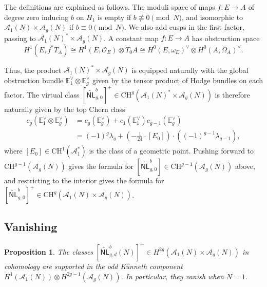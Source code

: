 \documentclass[12pt]{amsart}
\def\cA{\mathcal{A}}
\def\bE{\mathbb{E}}
\def\cO{\mathcal{O}}
\newcommand{\CH}{\mathrm{CH}}
\newcommand{\wNL}{{\widetilde{\mathsf{NL}}}}
\newtheorem{prop}[thm]{Proposition}
\theoremstyle{definition}
\begin{document}
 The definitions are explained as follows. The moduli space of maps $f:E\to A$ of degree zero inducing $b$ on $H_1$ is empty if $b\not\equiv0\pmod{N}$, and isomorphic to $\cA_1(N)\times\cA_g(N)$ if $b\equiv0\pmod{N}$. We also add cusps in the first factor, passing to $\cA_1(N)^{*}\times\cA_g(N)$. A constant map $f:E\to A$ has obstruction space 
 \begin{equation*}
 H^1(E,f^{*}T_A)\cong H^1(E,\cO_E)\otimes T_0A\cong H^0(E,\omega_E)^\vee \otimes H^0(A,\Omega_A)^\vee.
 \end{equation*}

 Thus, the product $\cA_1(N)^{*}\times\cA_g(N)$ is equipped naturally with the global obstruction bundle $\bE_1^{\vee}\otimes\bE_g^{\vee}$ given by the tensor product of Hodge bundles on each factor. The virtual class $[\wNL^b_{g,0}]^+\in \CH^g(\cA_1(N)^{*}\times\cA_g(N))$ is therefore naturally given by the top Chern class
 \begin{align*}
     c_g(\bE_1^{\vee}\otimes\bE_g^{\vee})&=c_g(\bE_g^{\vee})+c_1(\bE_1^{\vee})c_{g-1}(\bE_g^{\vee})\\
     &=(-1)^g\lambda_g+\left(-\frac{1}{24}\cdot[E_0]\right)\cdot((-1)^{g-1}\lambda_{g-1}),
 \end{align*}
 where $[E_0]\in \CH^1(\cA_1^{*})$ is the class of a geometric point. Pushing forward to $\CH^{g-1}(\cA_g(N))$ gives the formula for $[\wNL^b_{g,0}]\in \CH^{g-1}(\cA_g(N))$ above, and restricting to the interior gives the formula for $ [\wNL^b_{g,0}]^+\in \CH^g(\cA_1(N)\times\cA_g(N))$.

 \subsection{Vanishing}

\begin{prop}\label{N=1_trivial}
The classes $[\wNL^b_{g,d}(N)]^+\in H^{2g}(\cA_1(N)\times\cA_g(N))$ in cohomology are supported in the odd K\"{u}nneth component $H^{1}(\cA_1(N))\otimes H^{2g-1}(\cA_g(N))$. In particular, they vanish when $N=1$.
\end{prop}
\end{document}
